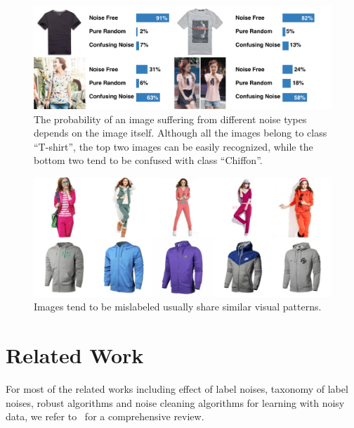 \documentclass[10pt,twocolumn,letterpaper]{article}
\begin{document}
\begin{figure}[t]
\begin{center}
\includegraphics[width=1.0\linewidth]{figure/noise_level.pdf}
\end{center}
\caption{The probability of an image suffering from different noise types depends on the image itself. Although all the images belong to class ``T-shirt'', the top two images can be easily recognized, while the bottom two tend to be confused with class ``Chiffon''.}
\label{fig:compare_noise_level}
\end{figure}

\begin{figure}[t]
\begin{center}
\includegraphics[width=1.0\linewidth]{figure/noise_cluster.pdf}
\end{center}
\caption{Images tend to be mislabeled usually share similar visual patterns.}
\label{fig:noise_cluster}
\end{figure}

\section{Related Work} %
\label{sec:related_work}
For most of the related works including effect of label noises, taxonomy of label noises, robust algorithms and noise cleaning algorithms for learning with noisy data, we refer to~\cite{frenay2013classification} for a comprehensive review. 
\end{document}
